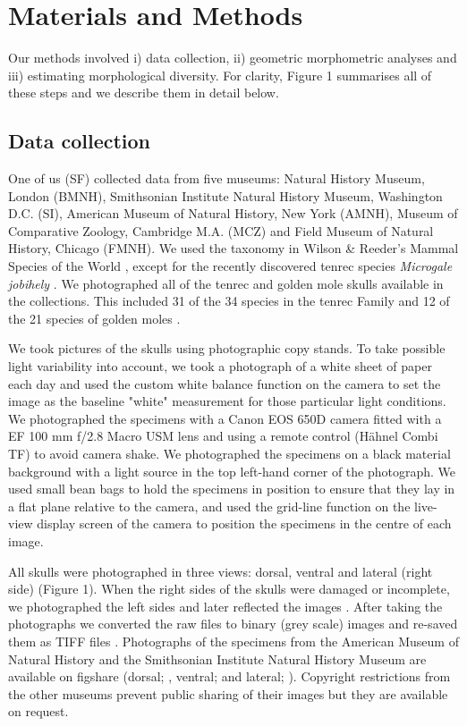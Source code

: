 \documentclass[12pt,a4paper]{article}
\begin{document}
\section{Materials and Methods}

	Our methods involved i) data collection, ii) geometric morphometric analyses and iii) estimating morphological diversity. For clarity,  Figure 1 summarises all of these steps and we describe them in detail below.  	
	
\subsection{Data collection}
	One of us (SF) collected data from five museums: Natural History Museum, London (BMNH), Smithsonian Institute Natural History Museum, Washington D.C. (SI), American Museum of Natural History, New York (AMNH), Museum of Comparative Zoology, Cambridge M.A. (MCZ) and Field Museum of Natural History, Chicago (FMNH). We used the taxonomy in Wilson \& Reeder's Mammal Species of the World \citeyearpar{Wilson2005}, except for the recently discovered tenrec species \textit{Microgale jobihely} \citep{Goodman2006}. We photographed all of the tenrec and golden mole skulls available in the collections. This included 31 of the 34 species in the tenrec Family \citep{Olson2013} and 12 of the 21 species of golden moles \citep{Wilson2005}.
	
	We took pictures of the skulls using photographic copy stands. To take possible light variability into account, we took a photograph of a white sheet of paper each day and used the custom white balance function on the camera to set the image as the baseline "white" measurement for those particular light conditions. We photographed the specimens with a Canon EOS 650D camera fitted with a EF 100 mm f/2.8 Macro USM lens and using a remote control (H\"ahnel Combi TF) to avoid camera shake. We photographed the specimens on a black material background with a light source in the top left-hand corner of the photograph. We used small bean bags to hold the specimens in position to ensure that they lay in a flat plane relative to the camera, and used the grid-line function on the live-view display screen of the camera to position the specimens in the centre of each image. 
	
	All skulls were photographed in three views: dorsal, ventral and lateral (right side) (Figure 1). When the right sides of the skulls were damaged or incomplete, we photographed the left sides and later reflected the images \citep[e.g.][]{Barrow2008}. After taking the photographs we converted the raw files to binary (grey scale) images and re-saved them as TIFF files \citep[uncompressed files preserve greater detail, ][]{RHOI2013}. Photographs of the specimens from the American Museum of Natural History and the Smithsonian Institute Natural History Museum are available on figshare (dorsal; \citet{Finlay2013d}, ventral; \citet{Finlay2013v} and lateral; \citet{Finlay2013l}). Copyright restrictions from the other museums prevent public sharing of their images but they are available on request.
\end{document}
